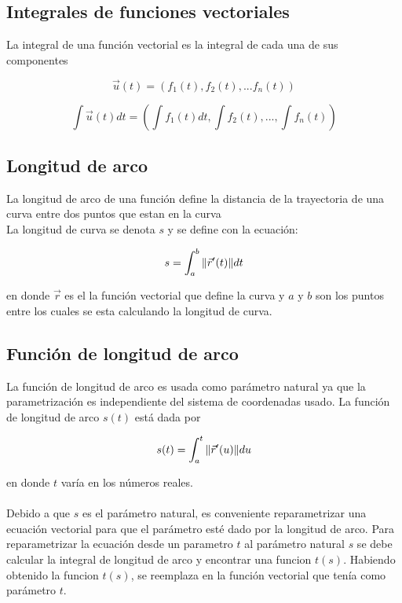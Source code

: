 \documentclass[12pt]{article}
\begin{document}
\subsection{Integrales de funciones vectoriales}

La integral de una funci\'{o}n vectorial es la integral de cada una de sus componentes

\begin{equation}
 \vec{u}(t) = (f_{1}(t),f_{2}(t),...f_{n}(t))
\end{equation}

\begin{equation}
 \int \vec{u}(t) dt = (\int f_{1}(t)dt ,\int f_{2}(t),...,\int f_{n}(t))
\end{equation}

\subsection{Longitud de arco}

La longitud de arco de una funci\'{o}n define la distancia de la trayectoria de una curva entre dos puntos que estan en la curva \\

La longitud de curva se denota $s$ y se define con la ecuaci\'{o}n:

\begin{equation}
 s= \int_{a}^{b} \Arrowvert{\vec{r}'(t)} \Arrowvert dt 
\end{equation}

en donde $\vec{r}$ es el la funci\'{o}n vectorial que define la curva y $a$ y $b$ son los puntos entre los cuales se esta calculando la longitud de curva.
 


\subsection{Funci\'{o}n de longitud de arco}

La funci\'{o}n de longitud de arco es usada como par\'{a}metro natural ya que la parametrizaci\'{o}n es independiente del sistema de coordenadas usado.
La funci\'{o}n de longitud de arco $s(t)$ est\'{a} dada por 

\begin{equation}
 s(t) = \int_{a}^{t} \Arrowvert{\vec{r}'(u)} \Arrowvert du
\end{equation}

en donde $t$ var\'{i}a en los n\'{u}meros reales. \\ \\
Debido a que $s$ es el par\'{a}metro natural, es conveniente reparametrizar una ecuaci\'{o}n vectorial para que el par\'{a}metro est\'{e} dado por la longitud
de arco. Para reparametrizar la ecuaci\'{o}n desde un parametro $t$ al par\'{a}metro natural $s$ se debe calcular la integral de longitud de arco y
encontrar una funcion $t(s)$. Habiendo obtenido la funcion $t(s)$, se reemplaza en la funci\'{o}n vectorial que ten\'{i}a como par\'{a}metro $t$.
\end{document}
